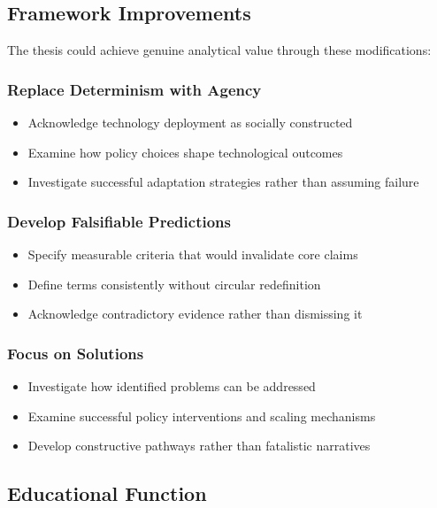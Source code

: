 \documentclass[11pt,a4paper]{article}
\begin{document}
\subsection{Framework Improvements}

The thesis could achieve genuine analytical value through these modifications:

\subsubsection{Replace Determinism with Agency}
\begin{itemize}[leftmargin=*]
\item Acknowledge technology deployment as socially constructed
\item Examine how policy choices shape technological outcomes
\item Investigate successful adaptation strategies rather than assuming failure
\end{itemize}

\subsubsection{Develop Falsifiable Predictions}
\begin{itemize}[leftmargin=*]
\item Specify measurable criteria that would invalidate core claims
\item Define terms consistently without circular redefinition
\item Acknowledge contradictory evidence rather than dismissing it
\end{itemize}

\subsubsection{Focus on Solutions}
\begin{itemize}[leftmargin=*]
\item Investigate how identified problems can be addressed
\item Examine successful policy interventions and scaling mechanisms
\item Develop constructive pathways rather than fatalistic narratives
\end{itemize}

\subsection{Educational Function}
\end{document}
